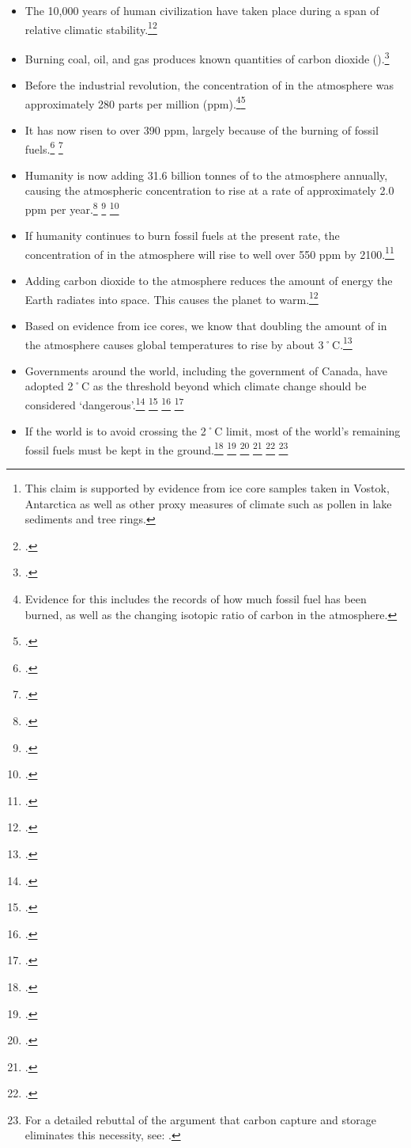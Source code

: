 \begin{itemize}
	\item The 10,000 years of human civilization have taken place during a span of relative climatic stability.\footnote{This claim is supported by evidence from ice core samples taken in Vostok, Antarctica as well as other proxy measures of climate such as pollen in lake sediments and tree rings.}\footcite[][p. 4]{Alley2000}
	\item Burning coal, oil, and gas produces known quantities of carbon dioxide ().\footcite[For example, the U.S. Environmental Protection Agency lists quantities of  produced by burning a barrel of oil, metric tonne of coal, or therm of natural gas:][]{CalculationsReferences}
	\item Before the industrial revolution, the concentration of  in the atmosphere was approximately 280 parts per million (ppm).\footnote{Evidence for this includes the records of how much fossil fuel has been burned, as well as the changing isotopic ratio of carbon in the atmosphere.}\footcite[][]{IPCC4ARdrivers}
	\item It has now risen to over 390 ppm, largely because of the burning of fossil fuels.\footcite[][]{KeelingExplanation} \footcite[][p. xiv]{WorldBank4C}
	\item Humanity is now adding 31.6 billion tonnes of  to the atmosphere annually, causing the atmospheric concentration to rise at a rate of approximately 2.0 ppm per year.\footcite[][]{RedrawingClimateEnergy} \footcite[][]{NOAATrends} \footcite[See also: ][]{FaustianGrowth}
	\item If humanity continues to burn fossil fuels at the present rate, the concentration of  in the atmosphere will rise to well over 550 ppm by 2100.\footcite[][]{IPCCCO2proj}
	\item Adding carbon dioxide to the atmosphere reduces the amount of energy the Earth radiates into space. This causes the planet to warm.\footcite[][]{IPCC4ARdrivers}
	\item Based on evidence from ice cores, we know that doubling the amount of  in the atmosphere causes global temperatures to rise by about 3˚C.\footcite[][p. 473]{SafeOperatingSpace}
	\item Governments around the world, including the government of Canada, have adopted 2˚C as the threshold beyond which climate change should be considered `dangerous'.\footcite{CopenhagenAccord} \footcite[][p. 5]{CriticalDecade2013} \footcite[See also: ][p. 473]{SafeOperatingSpace} \footcite[See also: ][]{EmGapReport}
	\item If the world is to avoid crossing the 2˚C limit, most of the world's remaining fossil fuels must be kept in the ground.\footcite[][]{IEA2012} \footcite[][]{EconomistUnburnable} \footcite[][]{TerrifyingNewMath} \footcite[The Australian government's Climate Commission states that most fossil fuels must be left in the ground and cannot be burned ][p. 5]{CriticalDecade2013} \footcite[][]{ChallengeTwoDegrees} \footnote{For a detailed rebuttal of the argument that carbon capture and storage eliminates this necessity, see: .}
\end{itemize}


